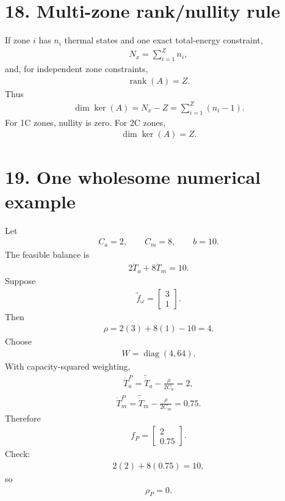 \documentclass[11pt]{article}
\begin{document}
\section*{18. Multi-zone rank/nullity rule}

If zone \(i\) has \(n_i\) thermal states and one exact total-energy constraint,
\begin{align}
N_x=\sum_{i=1}^{Z}n_i,
\end{align}
and, for independent zone constraints,
\begin{align}
\operatorname{rank}(A)=Z.
\end{align}
Thus
\begin{align}
\boxed{\dim\ker(A)=N_x-Z=\sum_{i=1}^{Z}(n_i-1).}
\tag{E5.61}
\end{align}
For 1C zones, nullity is zero. For 2C zones,
\begin{align}
\boxed{\dim\ker(A)=Z.}
\tag{E5.62}
\end{align}

\section*{19. One wholesome numerical example}

Let
\begin{align}
\boxed{C_a=2,\qquad C_m=8,\qquad b=10.}
\tag{E5.63}
\end{align}
The feasible balance is
\begin{align}
\boxed{2\dot T_a+8\dot T_m=10.}
\tag{E5.64}
\end{align}
Suppose
\begin{align}
\boxed{\widetilde f_\omega=\begin{bmatrix}3\\1\end{bmatrix}.}
\tag{E5.65}
\end{align}
Then
\begin{align}
\boxed{\rho=2(3)+8(1)-10=4.}
\tag{E5.66}
\end{align}
Choose
\begin{align}
\boxed{W=\operatorname{diag}(4,64).}
\tag{E5.67}
\end{align}
With capacity-squared weighting,
\begin{align}
\boxed{\dot T_a^P=\widetilde{\dot T}_a-\frac{\rho}{2C_a}=2,}
\tag{E5.68}
\end{align}
\begin{align}
\boxed{\dot T_m^P=\widetilde{\dot T}_m-\frac{\rho}{2C_m}=0.75.}
\tag{E5.69}
\end{align}
Therefore
\begin{align}
\boxed{f_P=\begin{bmatrix}2\\0.75\end{bmatrix}.}
\tag{E5.70}
\end{align}
Check:
\begin{align}
2(2)+8(0.75)=10,
\end{align}
so
\begin{align}
\boxed{\rho_P=0.}
\tag{E5.71}
\end{align}
\end{document}
